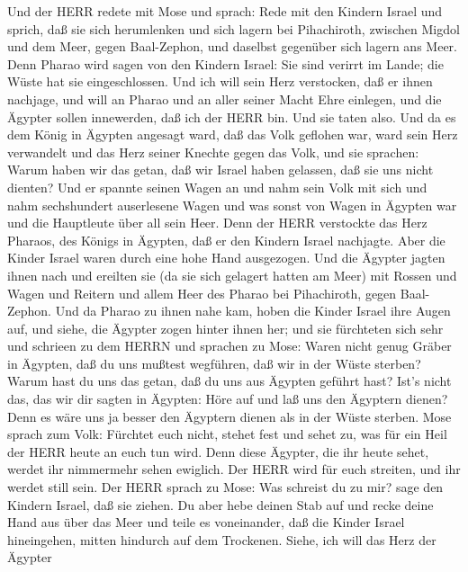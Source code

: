  Und der HERR redete mit Mose und sprach:  Rede
mit den Kindern Israel und sprich, daß sie sich herumlenken und sich
lagern bei Pihachiroth, zwischen Migdol und dem Meer, gegen Baal-Zephon,
und daselbst gegenüber sich lagern ans Meer.  Denn Pharao
wird sagen von den Kindern Israel: Sie sind verirrt im Lande; die Wüste
hat sie eingeschlossen.  Und ich will sein Herz verstocken,
daß er ihnen nachjage, und will an Pharao und an aller seiner Macht Ehre
einlegen, und die Ägypter sollen innewerden, daß ich der HERR bin. Und
sie taten also.  Und da es dem König in Ägypten angesagt
ward, daß das Volk geflohen war, ward sein Herz verwandelt und das Herz
seiner Knechte gegen das Volk, und sie sprachen: Warum haben wir das
getan, daß wir Israel haben gelassen, daß sie uns nicht dienten?
 Und er spannte seinen Wagen an und nahm sein Volk mit sich
 und nahm sechshundert auserlesene Wagen und was sonst von
Wagen in Ägypten war und die Hauptleute über all sein Heer. 
Denn der HERR verstockte das Herz Pharaos, des Königs in Ägypten, daß er
den Kindern Israel nachjagte. Aber die Kinder Israel waren durch eine
hohe Hand ausgezogen.  Und die Ägypter jagten ihnen nach und
ereilten sie (da sie sich gelagert hatten am Meer) mit Rossen und Wagen
und Reitern und allem Heer des Pharao bei Pihachiroth, gegen
Baal-Zephon.  Und da Pharao zu ihnen nahe kam, hoben die
Kinder Israel ihre Augen auf, und siehe, die Ägypter zogen hinter ihnen
her; und sie fürchteten sich sehr und schrieen zu dem HERRN
 und sprachen zu Mose: Waren nicht genug Gräber in Ägypten,
daß du uns mußtest wegführen, daß wir in der Wüste sterben? Warum hast
du uns das getan, daß du uns aus Ägypten geführt hast? 
Ist's nicht das, das wir dir sagten in Ägypten: Höre auf und laß uns den
Ägyptern dienen? Denn es wäre uns ja besser den Ägyptern dienen als in
der Wüste sterben.  Mose sprach zum Volk: Fürchtet euch
nicht, stehet fest und sehet zu, was für ein Heil der HERR heute an euch
tun wird. Denn diese Ägypter, die ihr heute sehet, werdet ihr nimmermehr
sehen ewiglich.  Der HERR wird für euch streiten, und ihr
werdet still sein.  Der HERR sprach zu Mose: Was schreist
du zu mir? sage den Kindern Israel, daß sie ziehen.  Du
aber hebe deinen Stab auf und recke deine Hand aus über das Meer und
teile es voneinander, daß die Kinder Israel hineingehen, mitten hindurch
auf dem Trockenen.  Siehe, ich will das Herz der Ägypter
